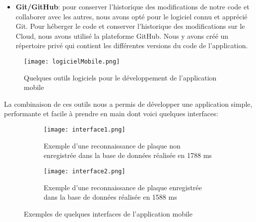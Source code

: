 \begin{itemize}
        \item \textbf{Git/GitHub}: pour conserver l’historique des modifications de notre code et collaborer avec les autres, nous avons opté pour le logiciel connu et apprécié Git. Pour héberger le code et conserver l’historique des modifications sur le Cloud, nous avons utilisé la plateforme GitHub. Nous y avons créé un répertoire privé qui contient les différentes versions du code de l’application.
    \end{itemize}
    \begin{figure}
        \centering
        \texttt{[image: logicielMobile.png]}
        \caption{Quelques outils logiciels pour le développement de l'application mobile}
    \end{figure}
La combinaison de ces outils nous a permis de développer une application simple, performante et facile à prendre en main dont voici quelques interfaces:
\begin{figure}[H]
    \begin{subfigure}{0.3\textwidth}
        \centering
        \texttt{[image: interface1.png]}
        \caption{Exemple d'une reconnaissance de plaque non enregistrée dans la base de données réalisée en 1788 ms}
    \end{subfigure}
    \hfill
    \begin{subfigure}{0.3\textwidth}
        \centering
        \texttt{[image: interface2.png]}
        \caption{Exemple d'une reconnaissance de plaque enregistrée dans la base de données réalisée en 1588 ms}
    \end{subfigure}
    \caption{Exemples de quelques interfaces de l'application mobile}
\end{figure}



